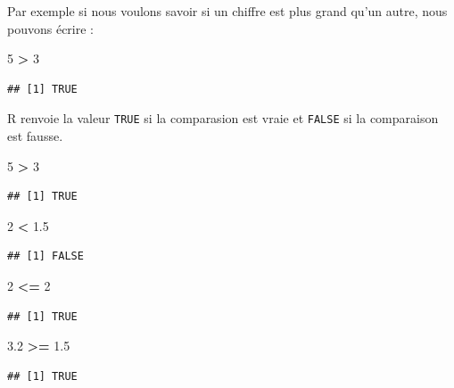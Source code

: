 \documentclass[]{book}
\newenvironment{Shaded}{\begin{snugshade}}{\end{snugshade}}
\newcommand{\DecValTok}[1]{\textcolor[rgb]{0.00,0.00,0.81}{#1}}
\newcommand{\FloatTok}[1]{\textcolor[rgb]{0.00,0.00,0.81}{#1}}
\newcommand{\OperatorTok}[1]{\textcolor[rgb]{0.81,0.36,0.00}{\textbf{#1}}}
\newcommand{\StringTok}[1]{\textcolor[rgb]{0.31,0.60,0.02}{#1}}
\begin{document}
Par exemple si nous voulons savoir si un chiffre est plus grand qu'un autre, nous pouvons écrire :

\begin{Shaded}
\begin{Highlighting}[]
\DecValTok{5} \OperatorTok{>}\StringTok{ }\DecValTok{3} 
\end{Highlighting}
\end{Shaded}

\begin{verbatim}
## [1] TRUE
\end{verbatim}

R renvoie la valeur \texttt{TRUE} si la comparasion est vraie et \texttt{FALSE} si la comparaison est fausse.

\begin{Shaded}
\begin{Highlighting}[]
\DecValTok{5} \OperatorTok{>}\StringTok{ }\DecValTok{3}
\end{Highlighting}
\end{Shaded}

\begin{verbatim}
## [1] TRUE
\end{verbatim}

\begin{Shaded}
\begin{Highlighting}[]
\DecValTok{2} \OperatorTok{<}\StringTok{ }\FloatTok{1.5}
\end{Highlighting}
\end{Shaded}

\begin{verbatim}
## [1] FALSE
\end{verbatim}

\begin{Shaded}
\begin{Highlighting}[]
\DecValTok{2} \OperatorTok{<=}\StringTok{ }\DecValTok{2}
\end{Highlighting}
\end{Shaded}

\begin{verbatim}
## [1] TRUE
\end{verbatim}

\begin{Shaded}
\begin{Highlighting}[]
\FloatTok{3.2} \OperatorTok{>=}\StringTok{ }\FloatTok{1.5}
\end{Highlighting}
\end{Shaded}

\begin{verbatim}
## [1] TRUE
\end{verbatim}
\end{document}
